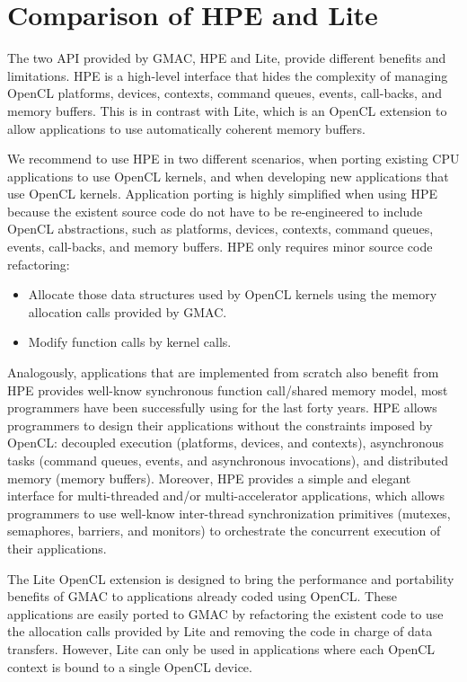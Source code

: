 \section{Comparison of HPE and Lite}
The two API provided by GMAC, HPE and Lite, provide different benefits and limitations. HPE is a 
high\hyp{}level interface that hides the complexity of managing OpenCL platforms, devices, contexts, 
command queues, events, call\hyp{}backs, and memory buffers. This is in contrast with Lite, which is 
an OpenCL extension to allow applications to use automatically coherent memory buffers.

We recommend to use HPE in two different scenarios, when porting existing CPU applications to use 
OpenCL kernels, and when developing new applications that use OpenCL kernels. Application porting is 
highly simplified when using HPE because the existent source code do not have to be 
re\hyp{}engineered to include OpenCL abstractions, such as platforms, devices, contexts, command 
queues, events, call\hyp{}backs, and memory buffers. HPE only requires minor source code 
refactoring:
\begin{itemize}
\item Allocate those data structures used by OpenCL kernels using the memory allocation calls 
provided by GMAC\@.
\item Modify function calls by kernel calls.
\end{itemize}
Analogously, applications that are implemented from scratch also benefit from HPE provides 
well\hyp{}know synchronous function call\slash shared memory model, most programmers have been 
successfully using for the last forty years. HPE allows programmers to design their applications 
without the constraints imposed by OpenCL: decoupled execution (\ie platforms, devices, and 
contexts), asynchronous tasks (\ie command queues, events, and asynchronous invocations), and 
distributed memory (\ie memory buffers). Moreover, HPE provides a simple and elegant interface for 
multi\hyp{}threaded and\slash or multi\hyp{}accelerator applications, which allows programmers to 
use well\hyp{}know inter\hyp{}thread synchronization primitives (\ie mutexes, semaphores, barriers, 
and monitors) to orchestrate the concurrent execution of their applications.

The Lite OpenCL extension is designed to bring the performance and portability benefits of GMAC to 
applications already coded using OpenCL\@. These applications are easily ported to GMAC by 
refactoring the existent code to use the allocation calls provided by Lite and removing the code in 
charge of data transfers. However, Lite can only be used in applications where each OpenCL context 
is bound to a single OpenCL device.


